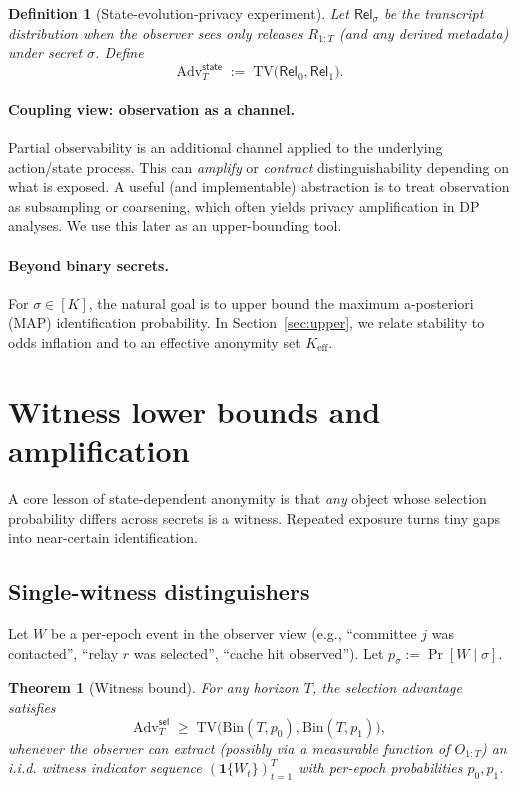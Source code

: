 \documentclass[11pt]{article}
\newtheorem{definition}{Definition}
\newtheorem{theorem}{Theorem}
\newcommand{\Adv}{\mathrm{Adv}}
\newcommand{\TV}{\mathrm{TV}}
\begin{document}
\begin{definition}[State-evolution-privacy experiment]
Let $\mathsf{Rel}_\sigma$ be the transcript distribution when the observer sees only releases $R_{1:T}$ (and any derived metadata) under secret $\sigma$.
Define
\[
\Adv^{\mathsf{state}}_T \;:=\; \TV\big(\mathsf{Rel}_0,\mathsf{Rel}_1\big).
\]
\end{definition}

\paragraph{Coupling view: observation as a channel.}
Partial observability is an additional channel applied to the underlying action/state process.
This can \emph{amplify} or \emph{contract} distinguishability depending on what is exposed.
A useful (and implementable) abstraction is to treat observation as subsampling or coarsening, which often yields privacy amplification in DP analyses.
We use this later as an upper-bounding tool.

\paragraph{Beyond binary secrets.}
For $\sigma\in[K]$, the natural goal is to upper bound the maximum a-posteriori (MAP) identification probability.
In Section~\ref{sec:upper}, we relate stability to odds inflation and to an effective anonymity set $K_{\mathrm{eff}}$.


\section{Witness lower bounds and amplification}
\label{sec:lower}

A core lesson of state-dependent anonymity is that \emph{any} object whose selection probability differs across secrets is a witness.
Repeated exposure turns tiny gaps into near-certain identification.

\subsection{Single-witness distinguishers}
\label{sec:witness}
Let $W$ be a per-epoch event in the observer view (e.g., ``committee $j$ was contacted'', ``relay $r$ was selected'', ``cache hit observed'').
Let $p_\sigma := \Pr[W\mid \sigma]$.

\begin{theorem}[Witness bound]
\label{thm:sel-witness}
For any horizon $T$, the selection advantage satisfies
\[
\Adv^{\mathsf{sel}}_T \;\ge\; \TV\big(\mathrm{Bin}(T,p_0),\mathrm{Bin}(T,p_1)\big),
\]
whenever the observer can extract (possibly via a measurable function of $O_{1:T}$) an i.i.d. witness indicator sequence $(\mathbf{1}\{W_t\})_{t=1}^T$ with per-epoch probabilities $p_0,p_1$.
\end{theorem}
\end{document}
